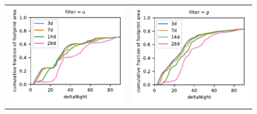 \documentclass[preprintm,linenumbers]{aastex631}
\begin{document}
		\begin{figure}
			\centering
			\begin{tabular}{@{}c@{}c@{}}
	\includegraphics{results/first_year_one_snap_v4_0_10yrs_db_noDD_noTwi_doAllTemplateMetrics_reduceDeltaNight_u.pdf} &
	\includegraphics{results/first_year_one_snap_v4_0_10yrs_db_noDD_noTwi_doAllTemplateMetrics_reduceDeltaNight_g.pdf} \\

\end{tabular}
\end{figure}
\end{document}
